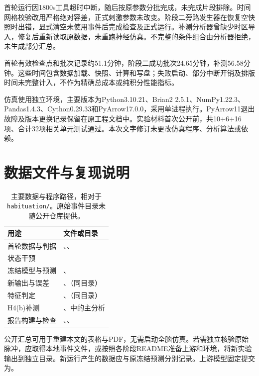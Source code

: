 首轮运行因1800s工具超时中断，随后按原参数分批完成，未完成片段排除。时间网格校验改用严格绝对容差，正式刺激参数未改变。阶段二旁路发生器在恢复空快照时出错，显式清空未使用事件后完成检查及正式运行。补测分析器曾缺少时区导入，修复后重新读取原数据，未重跑神经仿真。不完整的条件组合由分析器拒绝，未生成部分汇总。

首轮有效检查点和批次记录约51.1分钟，阶段二成功批次24.65分钟，补测56.58分钟。这些时间包含数据加载、快照、计算和写盘；失败启动、部分中断开销及排版时间未完整计入，不作为精确总成本或纯积分性能指标。

仿真使用独立环境，主要版本为Python3.10.21、Brian2 2.5.1、NumPy1.22.3、Pandas1.4.3、Cython0.29.33和PyArrow17.0.0，采用单进程执行。PyArrow11退出故障及版本更换记录保留在原工程文档中。实验材料首次公开前，共10+6+16项、合计32项相关单元测试通过。本次文字修订未更改仿真程序、分析算法或依赖。

\section{数据文件与复现说明}
\begin{table}[!htbp]\centering\small
\caption{主要数据与程序路径，相对于\texttt{habituation/}。原始事件目录未随公开仓库提供。}
\begin{tabularx}{\linewidth}{L{3.0cm}Y}\toprule
用途 & 文件或目录\\\midrule
首轮数据与判据 & 、、\\
状态干预 & \\
冻结模型与预测 & 、\\
新输出与误差 & 、（同目录）\\
特征判定 & 、（同目录）\\
H4(b)补测 & 、中的主分析\\
报告构建与检查 & 、、\\\bottomrule
\end{tabularx}\end{table}

公开汇总可用于重建本文的表格与PDF，无需启动全脑仿真。若需独立核验原始脉冲，应取得本地事件文件，或按照各阶段README准备上游和环境，将新实验输出到独立目录。新运行产生的数据应与原冻结预测分别记录。上游模型固定提交为。
\FloatBarrier
